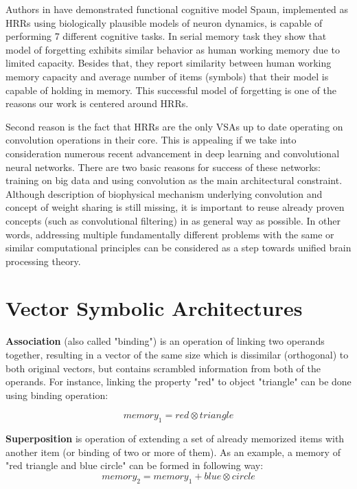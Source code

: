 \documentclass[conference]{IEEEtran}
\begin{document}
	
	Authors in \cite{Eliasmith:2012:LargeScaleModel} have demonstrated functional cognitive model Spaun, implemented as HRRs using biologically plausible models of neuron dynamics, is capable of performing 7 different cognitive tasks.
In serial memory task they show that model of forgetting exhibits similar behavior as human working memory due to limited capacity.
Besides that, they report similarity between human working memory capacity and average number of items (symbols) that their model is capable of holding in memory.
This successful model of forgetting is one of the reasons our work is centered around HRRs.
	
	Second reason is the fact that HRRs are the only VSAs up to date operating on convolution operations in their core.
This is appealing if we take into consideration numerous recent advancement in deep learning and convolutional neural networks.
There are two basic reasons for success of these networks: training on big data and using convolution as the main architectural constraint.
Although description of biophysical mechanism underlying convolution and concept of weight sharing is still missing, it is important to reuse already proven concepts (such as convolutional filtering) in as general way as possible.
In other words, addressing multiple fundamentally different problems with the same or similar computational principles can be considered as a step towards unified brain processing theory.
	
	\section{Vector Symbolic Architectures}
	
	\textbf{Association} (also called "binding") is an operation of linking two operands together, resulting in a vector of the same size which is dissimilar (orthogonal) to both original vectors, but contains scrambled information from both of the operands.
For instance, linking the property "red" to object "triangle" can be done using binding operation:
	
	\begin{equation}
	memory_1 = red \otimes triangle
	\end{equation}
	
	\textbf{Superposition} is operation of extending a set of already memorized items with another item (or binding of two or more of them).
As an example, a memory of "red triangle and blue circle" can be formed in following way:
	\begin{equation}
	memory_2 = memory_1 + blue \otimes circle
	\end{equation}
	
\end{document}
